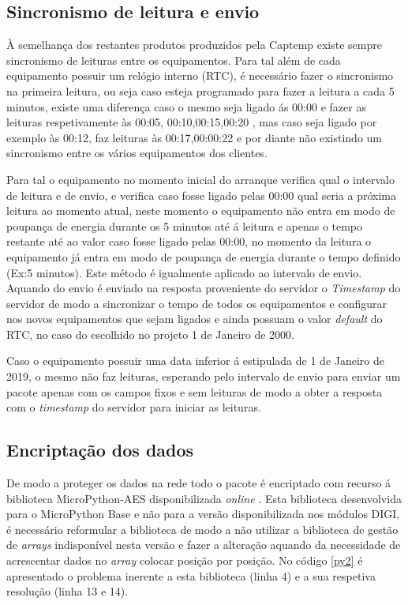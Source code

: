 \subsection {Sincronismo de leitura e envio} \label{sinc}

\par À semelhança dos restantes produtos produzidos pela Captemp existe sempre sincronismo de leituras entre os equipamentos. Para tal além de cada equipamento possuir um relógio interno (RTC), é necessário fazer o sincronismo na primeira leitura, ou seja caso esteja programado para fazer a leitura a cada 5 minutos, existe uma diferença caso o mesmo seja ligado ás 00:00 e fazer as leituras respetivamente às 00:05, 00:10,00:15,00:20 , mas caso seja ligado por exemplo às 00:12, faz leituras às 00:17,00:00:22 e por diante não existindo um sincronismo entre os vários equipamentos dos clientes.
\par Para tal o equipamento no momento inicial do arranque verifica qual o intervalo de leitura e de envio, e verifica caso fosse ligado pelas 00:00 qual seria a próxima leitura ao momento atual, neste momento o equipamento não entra em modo de poupança de energia durante os 5 minutos até á leitura e apenas o tempo restante até ao valor caso fosse ligado pelas 00:00, no momento da leitura o equipamento já entra em modo de poupança de energia durante o tempo definido (Ex:5 minutos). Este método é igualmente aplicado ao intervalo de envio. Aquando do envio é enviado na resposta proveniente do servidor o \textit{Timestamp} do servidor de modo a sincronizar o tempo de todos os equipamentos e configurar nos novos equipamentos que sejam ligados e ainda possuam o valor \textit{default} do RTC, no caso do escolhido no projeto 1 de Janeiro de 2000.
\par Caso o equipamento possuir uma data inferior á estipulada de 1 de Janeiro de 2019, o mesmo não faz leituras, esperando pelo intervalo de envio para enviar um pacote apenas com os campos fixos e sem leituras de modo a obter a resposta com o \textit{timestamp} do servidor para iniciar as leituras.


\subsection {Encriptação dos dados}

\par De modo a proteger os dados na rede todo o pacote é encriptado com recurso á biblioteca MicroPython-AES disponibilizada \textit{online} \cite{microaes}. Esta biblioteca desenvolvida para o MicroPython Base e não para a versão disponibilizada nos módulos DIGI, é necessário reformular a biblioteca de modo a não utilizar a biblioteca de gestão de \textit{arrays} indisponível nesta versão e fazer a alteração aquando da necessidade de acrescentar dados no \textit{array} colocar posição por posição. No código \ref{py2} é apresentado o problema inerente a esta biblioteca (linha 4) e a sua respetiva resolução (linha 13 e 14).



